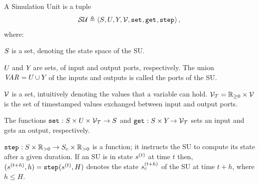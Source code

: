 \begin{definition}\label{def:fmu}
  A Simulation Unit is a tuple
  $$\mathcal{SU} \triangleq  \left\langle S_{}, U_{}, Y_{}, \mathcal{V}, \mathtt{set}_{}, \mathtt{get}_{}, \mathtt{step}_{} \right\rangle ,$$
  where:
  \begin{compactitem}
    \item $S_{}$ is a set, denoting the state space of the SU.
    \item $U_{}$ and $Y_{}$ are sets, of input and output ports, respectively.
    The union $\mathit{VAR_{}} = U_{} \cup Y_{}$ of the inputs and outputs is called the ports of the SU.
    \item $\mathcal{V}$ is a set, intuitively denoting the values that a variable can hold.
    $\mathcal{V_{T}} = \mathbb{R}_{\geq 0} \times \mathcal{V}$ is the set of timestamped values exchanged between input and output ports.
    \item 
    The functions
    $\mathtt{set}_{} : S_{} \times U_{} \times \mathcal{V_{T}} \to S_{}$ and $\mathtt{get}_{}: S_{} \times Y_{} \to \mathcal{V_{T}}$ sets an input and gets an output, respectively. 
    \item $\mathtt{step}_{}: S_{} \times \mathbb{R}_{> 0} \to S_{c} \times \mathbb{R}_{> 0} $ is a function; it instructs the SU to compute its state after a given duration. 
    If an SU is in state $s_{}^{(t)}$ at time $t$ then, $(s_{}^{(t+h)}, h) = \mathtt{step}_{}(s_{}^{(t)}, H)$ denotes the state $s_{c}^{(t+h)}$ of the SU at time $t+h$, where $h \leq H$. 
  \end{compactitem}
\end{definition}


